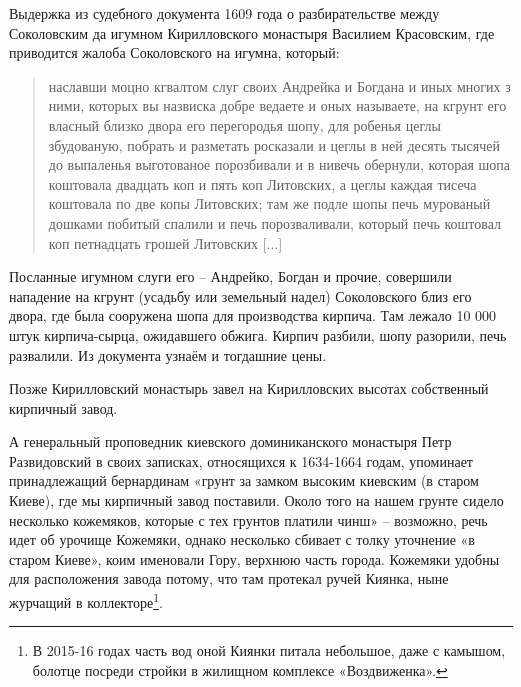 Выдержка из судебного документа 1609 года о разбирательстве между Соколовским да игумном Кирилловского монастыря Василием Красовским, где приводится жалоба Соколовского на игумна, который\cite{akty}:

\begin{quotation}
наславши моцно кгвалтом слуг своих Андрейка и Богдана и иных многих з ними, которых вы назвиска добре ведаете и оных называете, на кгрунт его власный близко двора его перегородья шопу, для робенья цеглы збудованую, побрать и разметать росказали и цеглы в ней десять тысячей до выпаленья выготованое порозбивали и в нивечь обернули, которая шопа коштовала двадцать коп и пять коп Литовских, а цеглы каждая тисеча коштовала по две копы Литовских; там же подле шопы печь мурованый дошками побитый спалили и печь порозваливали, который печь коштовал коп петнадцать грошей Литовских [...]
\end{quotation}

Посланные игумном слуги его – Андрейко, Богдан и прочие, совершили нападение на кгрунт (усадьбу или земельный надел) Соколовского близ его двора, где была сооружена шопа для производства кирпича. Там лежало 10 000 штук кирпича-сырца, ожидавшего обжига. Кирпич разбили, шопу разорили, печь развалили. Из документа узнаём и тогдашние цены. 

Позже Кирилловский монастырь завел на Кирилловских высотах собственный кирпичный завод.




А генеральный проповедник киевского доминиканского монастыря Петр Развидовский в своих записках, относящихся к 1634-1664 годам, упоминает\cite{sbornikmat} принадлежащий бернардинам «грунт за замком высоким киевским (в старом Киеве), где мы кирпичный завод поставили. Около того на нашем грунте сидело несколько кожемяков, которые с тех грунтов платили чинш» – возможно, речь идет об урочище Кожемяки, однако несколько сбивает с толку уточнение «в старом Киеве», коим именовали Гору, верхнюю часть города. Кожемяки удобны для расположения завода потому, что там протекал ручей Киянка, ныне журчащий в коллекторе\footnote{В 2015-16 годах часть вод оной Киянки питала небольшое, даже с камышом, болотце посреди стройки в жилищном комплексе «Воздвиженка».}.

